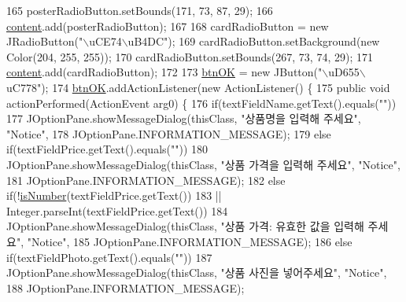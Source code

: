 \begin{DoxyCode}
165         posterRadioButton.setBounds(171, 73, 87, 29);
166         \hyperlink{classpkg_1_1_product_u_i_a4b906446ebd18ba32a11ace86f26fe12}{content}.add(posterRadioButton);
167         
168         cardRadioButton = \textcolor{keyword}{new} JRadioButton(\textcolor{stringliteral}{"\(\backslash\)uCE74\(\backslash\)uB4DC"});
169         cardRadioButton.setBackground(\textcolor{keyword}{new} Color(204, 255, 255));
170         cardRadioButton.setBounds(267, 73, 74, 29);
171         \hyperlink{classpkg_1_1_product_u_i_a4b906446ebd18ba32a11ace86f26fe12}{content}.add(cardRadioButton);
172         
173         \hyperlink{classpkg_1_1_product_u_i_ae48c36617559f56735461306acc07166}{btnOK} = \textcolor{keyword}{new} JButton(\textcolor{stringliteral}{"\(\backslash\)uD655\(\backslash\)uC778"});
174         \hyperlink{classpkg_1_1_product_u_i_ae48c36617559f56735461306acc07166}{btnOK}.addActionListener(\textcolor{keyword}{new} ActionListener() \{
175             \textcolor{keyword}{public} \textcolor{keywordtype}{void} actionPerformed(ActionEvent arg0) \{
176                 \textcolor{keywordflow}{if}(textFieldName.getText().equals(\textcolor{stringliteral}{""}))
177                     JOptionPane.showMessageDialog(thisClass, \textcolor{stringliteral}{"상품명을 입력해 주세요"}, \textcolor{stringliteral}{"Notice"}, 
178                             JOptionPane.INFORMATION\_MESSAGE);
179                 \textcolor{keywordflow}{else} \textcolor{keywordflow}{if}(textFieldPrice.getText().equals(\textcolor{stringliteral}{""}))
180                     JOptionPane.showMessageDialog(thisClass, \textcolor{stringliteral}{"상품 가격을 입력해 주세요"}, \textcolor{stringliteral}{"Notice"}, 
181                             JOptionPane.INFORMATION\_MESSAGE);
182                 \textcolor{keywordflow}{else} \textcolor{keywordflow}{if}(!\hyperlink{classpkg_1_1_product_u_i_a643538618cd15aa1607227e9f398554b}{isNumber}(textFieldPrice.getText())
183                         || Integer.parseInt(textFieldPrice.getText())%
184                     JOptionPane.showMessageDialog(thisClass, \textcolor{stringliteral}{"상품 가격: 유효한 값을 입력해 주세요"}, \textcolor{stringliteral}{"Notice"}, 
185                             JOptionPane.INFORMATION\_MESSAGE);
186                 \textcolor{keywordflow}{else} \textcolor{keywordflow}{if}(textFieldPhoto.getText().equals(\textcolor{stringliteral}{""}))
187                     JOptionPane.showMessageDialog(thisClass, \textcolor{stringliteral}{"상품 사진을 넣어주세요"}, \textcolor{stringliteral}{"Notice"}, 
188                             JOptionPane.INFORMATION\_MESSAGE);

\end{DoxyCode}
